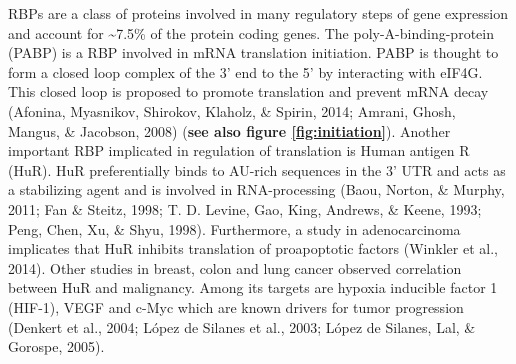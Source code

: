 \documentclass[
  12pt,
  openany]{book}
\begin{document}
RBPs are a class of proteins involved in many regulatory steps of gene expression and account for \textasciitilde7.5\% of the protein coding genes. The poly-A-binding-protein (PABP) is a RBP involved in mRNA translation initiation. PABP is thought to form a closed loop complex of the 3' end to the 5' by interacting with eIF4G. This closed loop is proposed to promote translation and prevent mRNA decay (Afonina, Myasnikov, Shirokov, Klaholz, \& Spirin, 2014; Amrani, Ghosh, Mangus, \& Jacobson, 2008) (\textbf{see also figure \ref{fig:initiation}}). Another important RBP implicated in regulation of translation is Human antigen R (HuR). HuR preferentially binds to AU-rich sequences in the 3' UTR and acts as a stabilizing agent and is involved in RNA-processing (Baou, Norton, \& Murphy, 2011; Fan \& Steitz, 1998; T. D. Levine, Gao, King, Andrews, \& Keene, 1993; Peng, Chen, Xu, \& Shyu, 1998). Furthermore, a study in adenocarcinoma implicates that HuR inhibits translation of proapoptotic factors (Winkler et al., 2014). Other studies in breast, colon and lung cancer observed correlation between HuR and malignancy. Among its targets are hypoxia inducible factor 1 (HIF-1), VEGF and c-Myc which are known drivers for tumor progression (Denkert et al., 2004; López de Silanes et al., 2003; López de Silanes, Lal, \& Gorospe, 2005).
\clearpage
\end{document}
